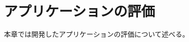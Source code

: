 \documentclass[main]{subfiles}
\begin{document}
\chapter{アプリケーションの評価}
\label{cha:evaluation}

本章では開発したアプリケーションの評価について述べる。
\end{document}
